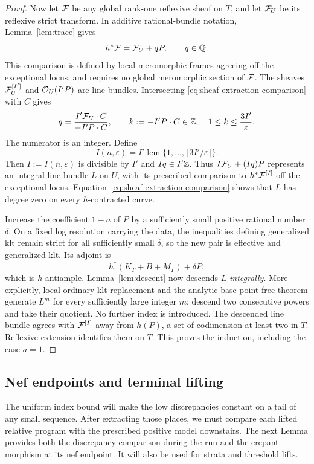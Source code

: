 \begin{proof}
Now let $\mathcal F$ be any global rank-one reflexive sheaf on $T$, and let
$\mathcal F_U$ be its reflexive strict transform.  In additive rational-bundle
notation, Lemma~\ref{lem:trace} gives
\begin{equation}\label{eq:sheaf-extraction-comparison}
 h^*\mathcal F=\mathcal F_U+qP,\qquad q\in\mathbb Q.
\end{equation}
This comparison is defined by local meromorphic frames agreeing off the
exceptional locus, and requires no global meromorphic section of $\mathcal F$.
The sheaves $\mathcal F_U^{[I']}$ and $\mathcal O_U(I'P)$ are line bundles.  Intersecting
\eqref{eq:sheaf-extraction-comparison} with $C$ gives
\[
 q=\frac{I'\mathcal F_U\cdot C}{-I'P\cdot C},
 \qquad k:=-I'P\cdot C\in\mathbb Z,
 \quad 1\leq k\leq\frac{3I'}{\varepsilon}.
\]
The numerator is an integer.  Define
\begin{equation}\label{eq:index-recurrence}
 I(n,\varepsilon)
   =I'\operatorname{lcm}
       \{1,\ldots,\lceil3I'/\varepsilon\rceil\}.
\end{equation}
Then $I:=I(n,\varepsilon)$ is divisible by $I'$ and $Iq\in I'\mathbb Z$.
Thus $I\mathcal F_U+(Iq)P$ represents an integral line bundle $L$ on $U$,
with its prescribed comparison to $h^*\mathcal F^{[I]}$ off the exceptional
locus.  Equation~\eqref{eq:sheaf-extraction-comparison} shows that $L$ has
degree zero on every $h$-contracted curve.

Increase the coefficient $1-a$ of $P$ by a sufficiently small positive
rational number $\delta$.  On a fixed log resolution carrying the data,
the inequalities defining generalized klt remain strict for all sufficiently
small $\delta$, so the new pair is effective and generalized klt.  Its
adjoint is
\[
 h^*(K_T+B+M_T)+\delta P,
\]
which is $h$-antiample.  Lemma~\ref{lem:descent} now descends $L$
\emph{integrally}.  More explicitly, local ordinary klt replacement and
the analytic base-point-free theorem generate $L^m$ for every sufficiently
large integer $m$; descend two consecutive powers and take their quotient.
No further index is introduced.  The descended line bundle agrees with
$\mathcal F^{[I]}$ away from $h(P)$, a set of codimension at least two in $T$.
Reflexive extension identifies them on $T$.  This proves the induction,
including the case $a=1$.
\end{proof}

\subsection{Nef endpoints and terminal lifting}

The uniform index bound will make the low discrepancies constant on a
tail of any small sequence.  After extracting those places, we must compare
each lifted relative program with the prescribed positive model downstairs.
The next Lemma provides both the discrepancy comparison during the run
and the crepant morphism at its nef endpoint.  It will also be used for
strata and threshold lifts.

